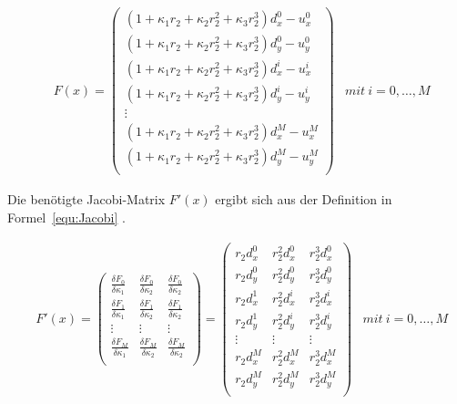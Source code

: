 \begin{equation}
\label{equ:Problem}
\begin{aligned}
&F(x)=
\begin{pmatrix}
(1+\kappa_1 r_2 + \kappa_2 r_2^2 + \kappa_3 r_2^3)d_x^0 -u_x^0\\
(1+\kappa_1 r_2 + \kappa_2 r_2^2 + \kappa_3 r_2^3)d_y^0 -u_y^0\\
(1+\kappa_1 r_2 + \kappa_2 r_2^2 + \kappa_3 r_2^3)d_x^i -u_x^i\\
(1+\kappa_1 r_2 + \kappa_2 r_2^2 + \kappa_3 r_2^3)d_y^i -u_y^i\\
\vdots\\
(1+\kappa_1 r_2 + \kappa_2 r_2^2 + \kappa_3 r_2^3)d_x^M -u_x^M\\
(1+\kappa_1 r_2 + \kappa_2 r_2^2 + \kappa_3 r_2^3)d_y^M -u_y^M\\
\end{pmatrix}
&mit\ i = 0,\dots,M
\end{aligned}
\end{equation}

Die benötigte Jacobi-Matrix $F'(x)$ ergibt sich aus der Definition in Formel~\ref{equ:Jacobi} .

\begin{equation}
\label{equ:Jacobi}
\begin{aligned}
&F'(x)=
\begin{pmatrix}
\frac{\delta F_0}{\delta \kappa_1} & \frac{\delta F_0}{\delta \kappa_2} & \frac{\delta F_0}{\delta \kappa_2}\\
\frac{\delta F_1}{\delta \kappa_1} & \frac{\delta F_1}{\delta \kappa_2} & \frac{\delta F_1}{\delta \kappa_2}\\
 \vdots & \vdots & \vdots \\
\frac{\delta F_M}{\delta \kappa_1} & \frac{\delta F_M}{\delta \kappa_2} & \frac{\delta F_M}{\delta \kappa_2}\\
\end{pmatrix}= \begin{pmatrix}
r_2d_x^0 & r_2^2d_x^0 & r_2^3d_x^0\\
r_2d_y^0 & r_2^2d_y^0 & r_2^3d_y^0\\
r_2d_x^1 & r_2^2d_x^i & r_2^3d_x^i\\
r_2d_y^1 & r_2^2d_y^i & r_2^3d_y^i\\
\vdots & \vdots & \vdots \\
r_2d_x^M & r_2^2d_x^M & r_2^3d_x^M\\
r_2d_y^M & r_2^2d_y^M & r_2^3d_y^M\\
\end{pmatrix}
&mit\ i = 0,\dots,M
\end{aligned}
\end{equation}

